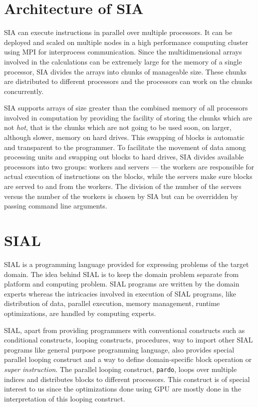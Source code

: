 \section{Architecture of SIA}\label{siaarch}
SIA can execute instructions in parallel over multiple processors. It can be
deployed and scaled on multiple nodes in a high performance computing cluster
using MPI for interprocess communication. Since the
multidimensional arrays involved in the calculations can be extremely large for
the memory of a single processor, SIA divides the arrays into chunks of
manageable size. These chunks are distributed to different processors and the
processors can work on the chunks concurrently.

SIA supports arrays of size greater than the combined memory of all processors
involved in computation by providing the facility of storing the chunks which are
not \textit{hot}, that is the chunks which are not going to be used soon, on
larger, although slower, memory on hard drives. This swapping of blocks is automatic
and transparent to the programmer. To facilitate the movement of data among
processing units and swapping out blocks to hard drives, SIA divides available
processors into two groups: workers and servers --- the workers are responsible for
actual execution of instructions on the blocks, while the servers make sure blocks
are served to and from the workers. The division of the number of the servers versus the number
of the workers is chosen by SIA but can be overridden by passing command line
arguments.

\section{SIAL}
SIAL is a programming language provided for expressing problems of the target
domain. The idea behind SIAL is to keep the domain problem separate from
platform and computing problem. SIAL programs are written by the domain experts
whereas the intricacies involved in execution of SIAL programs, like distribution of
data, parallel execution, memory management, runtime optimizations, are handled
by computing experts.

SIAL, apart from providing programmers with conventional constructs such as
conditional constructs, looping constructs, procedures, way to import other SIAL
programs like general purpose programming language, also provides special parallel looping construct and a way
to define domain-specific block operation or \textit{super instruction}. The
parallel looping construct, \texttt{pardo}, loops over multiple indices and
distributes blocks to different processors. This construct is of special
interest to us since the optimizations done using GPU are mostly done in the
interpretation of this looping construct.

